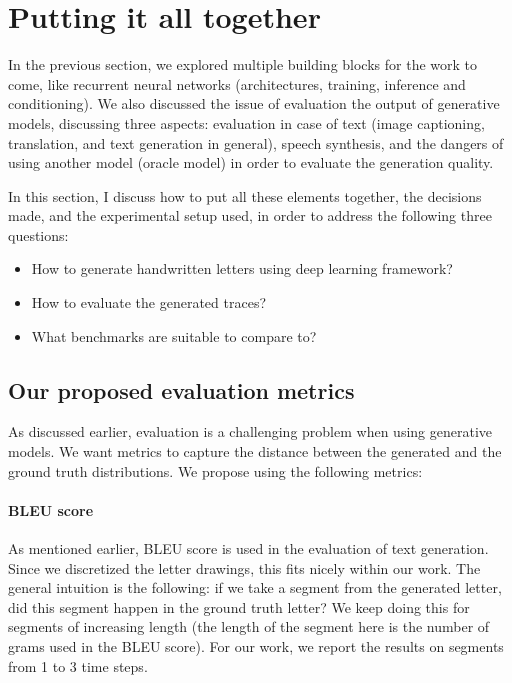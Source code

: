 
\section{Putting it all together}
\par In the previous section, we explored multiple building blocks for the work to come, like recurrent neural networks (architectures, training, inference and conditioning). We also discussed the issue of evaluation the output of generative models, discussing three aspects: evaluation in case of text (image captioning, translation, and text generation in general), speech synthesis, and the dangers of using another model (oracle model) in order to evaluate the generation quality.

\par In this section, I discuss how to put all these elements together, the decisions made, and the experimental setup used, in order to address the following three questions:
\begin{itemize}
    \item How to generate handwritten letters using deep learning framework?
    \item How to evaluate the generated traces?
    \item What benchmarks are suitable to compare to?
\end{itemize}

\subsection{Our proposed evaluation metrics}\label{subsec:eval_metrics}
\par As discussed earlier, evaluation is a challenging problem when using generative models. We want metrics to capture the distance between the generated and the ground truth distributions. We propose using the following metrics:

\paragraph{BLEU score} As mentioned earlier, BLEU score is used in the evaluation of text generation. Since we discretized the letter drawings, this fits nicely within our work. The general intuition is the following: if we take a segment from the generated letter, did this segment happen in the ground truth letter? We keep doing this for segments of increasing length (the length of the segment here is the number of grams used in the BLEU score). For our work, we report the results on segments from 1 to 3 time steps.

